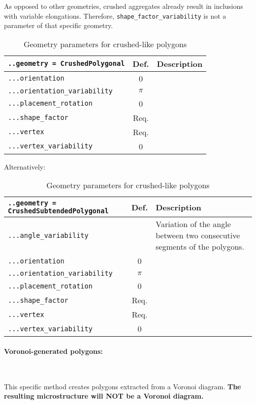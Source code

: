 \documentclass[10pt]{article}
\newcommand{\whiteline}{\textcolor{white}{.\\}}
\begin{document}
As opposed to other geometries, crushed aggregates already result in inclusions with variable elongations.
Therefore, \verb+shape_factor_variability+ is not a parameter of that specific geometry.

\begin{table}[h!]
\begin{tabularx}{\textwidth}{lcX}
\verb+..geometry = CrushedPolygonal+ & Def. & Description\\
\hline
\verb+...orientation+ & 0 & \\
\verb+...orientation_variability+ & $\pi$ & \\
\verb+...placement_rotation+ & 0 & \\
\verb+...shape_factor+ &  Req. & \\
\verb+...vertex+ &  Req. & \\
\verb+...vertex_variability+ & 0 & \\
\hline
\end{tabularx}
\caption{Geometry parameters for crushed-like polygons}
\end{table}

Alternatively:

\begin{table}[h!]
\begin{tabularx}{\textwidth}{lcX}
\verb+..geometry = CrushedSubtendedPolygonal+ & Def. & Description\\
\hline
\verb+...angle_variability+ & & Variation of the angle between two consecutive segments of the polygons.\\
\verb+...orientation+ & 0 & \\
\verb+...orientation_variability+ & $\pi$ & \\
\verb+...placement_rotation+ & 0 & \\
\verb+...shape_factor+ &  Req. & \\
\verb+...vertex+ &  Req. & \\
\verb+...vertex_variability+ & 0 & \\
\hline
\end{tabularx}
\caption{Geometry parameters for crushed-like polygons}
\end{table}

\eject

\paragraph{Voronoi-generated polygons:} \whiteline

This specific method creates polygons extracted from a Voronoi diagram.
\textbf{The resulting microstructure will NOT be a Voronoi diagram.}
\end{document}
